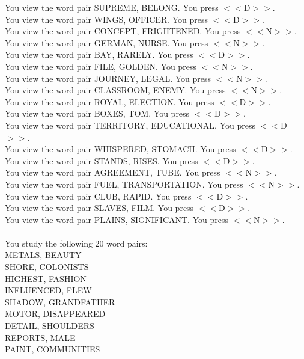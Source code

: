 \documentclass[pdflatex,sn-nature]{sn-jnl}%
\theoremstyle{thmstyleone}%
\theoremstyle{thmstyletwo}%
\theoremstyle{thmstylethree}%
\begin{document}
You view the word pair SUPREME, BELONG. You press $<<$D$>>$. $~$\\ 
You view the word pair WINGS, OFFICER. You press $<<$D$>>$. $~$\\ 
You view the word pair CONCEPT, FRIGHTENED. You press $<<$N$>>$. $~$\\ 
You view the word pair GERMAN, NURSE. You press $<<$N$>>$. $~$\\ 
You view the word pair BAY, RARELY. You press $<<$D$>>$. $~$\\ 
You view the word pair FILE, GOLDEN. You press $<<$N$>>$. $~$\\ 
You view the word pair JOURNEY, LEGAL. You press $<<$N$>>$. $~$\\ 
You view the word pair CLASSROOM, ENEMY. You press $<<$N$>>$. $~$\\ 
You view the word pair ROYAL, ELECTION. You press $<<$D$>>$. $~$\\ 
You view the word pair BOXES, TOM. You press $<<$D$>>$. $~$\\ 
You view the word pair TERRITORY, EDUCATIONAL. You press $<<$D$>>$. $~$\\ 
You view the word pair WHISPERED, STOMACH. You press $<<$D$>>$. $~$\\ 
You view the word pair STANDS, RISES. You press $<<$D$>>$. $~$\\ 
You view the word pair AGREEMENT, TUBE. You press $<<$N$>>$. $~$\\ 
You view the word pair FUEL, TRANSPORTATION. You press $<<$N$>>$. $~$\\ 
You view the word pair CLUB, RAPID. You press $<<$D$>>$. $~$\\ 
You view the word pair SLAVES, FILM. You press $<<$D$>>$. $~$\\ 
You view the word pair PLAINS, SIGNIFICANT. You press $<<$N$>>$. $~$\\ 
 $~$\\ 
You study the following 20 word pairs: $~$\\ 
METALS, BEAUTY $~$\\ 
SHORE, COLONISTS $~$\\ 
HIGHEST, FASHION $~$\\ 
INFLUENCED, FLEW $~$\\ 
SHADOW, GRANDFATHER $~$\\ 
MOTOR, DISAPPEARED $~$\\ 
DETAIL, SHOULDERS $~$\\ 
REPORTS, MALE $~$\\ 
PAINT, COMMUNITIES $~$\\ 
\end{document}
